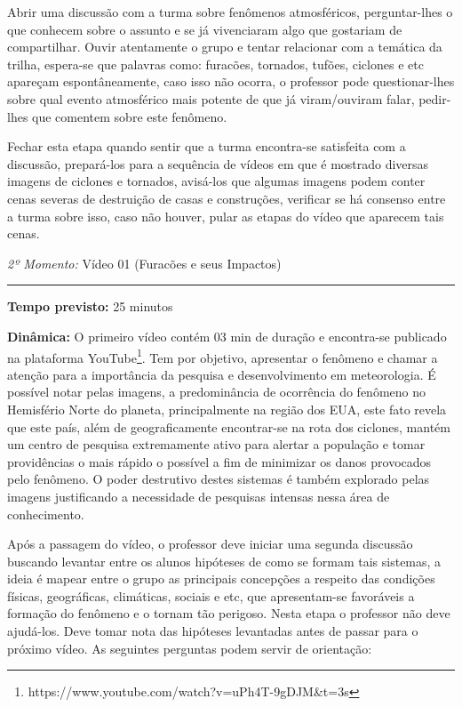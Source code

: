 \documentclass[
12pt,				%
openright,			%
oneside,			%
a4paper,			%
chapter=TITLE,		%
english,			%
brazil				%
]{abntex2}
\begin{document}
Abrir uma discussão com a turma sobre fenômenos atmosféricos, perguntar-lhes o que conhecem sobre o assunto e se já vivenciaram algo que gostariam de compartilhar. Ouvir atentamente o grupo e tentar relacionar com a temática da trilha, espera-se que palavras como: furacões, tornados, tufões, ciclones e etc apareçam espontâneamente, caso isso não ocorra, o professor pode questionar-lhes sobre qual evento atmosférico mais potente de que já viram/ouviram falar, pedir-lhes que comentem sobre este fenômeno.

Fechar esta etapa quando sentir que a turma encontra-se satisfeita com a discussão, prepará-los para a sequência de vídeos em que é mostrado diversas imagens de ciclones e tornados, avisá-los que algumas imagens podem conter cenas severas de destruição de casas e construções, verificar se há consenso entre a turma sobre isso, caso não houver, pular as etapas do vídeo que aparecem tais cenas.

\vspace{50pt}
\noindent\emph{2º Momento:} Vídeo 01 (Furacões e seus Impactos)
\par\noindent\rule{.3\textwidth}{.5pt}    
\par\noindent\textbf{Tempo previsto:} 25 minutos


\noindent\textbf{Dinâmica:} O primeiro vídeo contém 03 min de duração e encontra-se publicado na plataforma YouTube\footnote{https://www.youtube.com/watch?v=uPh4T-9gDJM\&t=3s}. Tem por objetivo, apresentar o fenômeno e chamar a atenção para a importância da pesquisa e desenvolvimento em meteorologia. É possível notar pelas imagens, a predominância de ocorrência do fenômeno no Hemisfério Norte do planeta, principalmente na região dos EUA, este fato revela que este país, além de geograficamente encontrar-se na rota dos ciclones, mantém um centro de pesquisa extremamente ativo para alertar a população e tomar providências o mais rápido o possível a fim de minimizar os danos provocados pelo fenômeno. O poder destrutivo destes sistemas é também explorado pelas imagens justificando a necessidade de pesquisas intensas nessa área de conhecimento.

Após a passagem do vídeo, o professor deve iniciar uma segunda discussão buscando levantar entre os alunos hipóteses de como se formam tais sistemas, a ideia é  mapear entre o grupo as principais concepções a respeito das condições físicas, geográficas, climáticas, sociais e etc, que apresentam-se favoráveis a formação do fenômeno e o tornam tão perigoso. Nesta etapa o professor não deve ajudá-los. Deve tomar nota das hipóteses levantadas antes de passar para o próximo vídeo. As seguintes perguntas podem servir de orientação:
\end{document}
